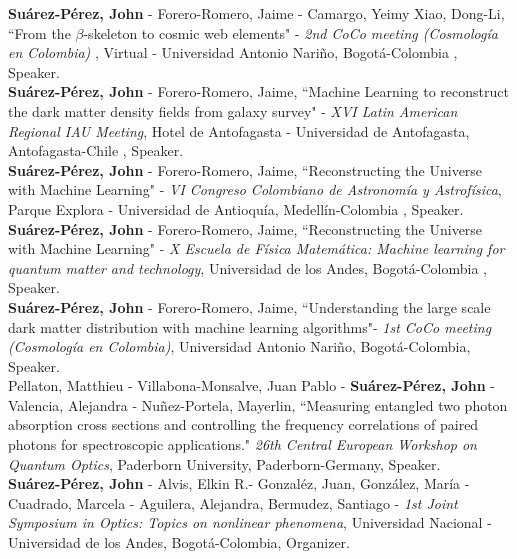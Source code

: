 \documentclass[10pt, a4paper]{article}
\newcommand{\years}[1]{\marginnote{\scriptsize #1}}
\begin{document}
\years{2020}\textbf{Suárez-Pérez, John} - Forero-Romero, Jaime - Camargo, Yeimy  Xiao, Dong-Li, “From the $\beta$-skeleton to cosmic web elements" - \emph{2nd CoCo meeting (Cosmología en Colombia) }, Virtual - Universidad Antonio Nariño, Bogotá-Colombia , Speaker.\\

\years{2019}\textbf{Suárez-Pérez, John} - Forero-Romero, Jaime, “Machine Learning to reconstruct the dark matter density fields from galaxy survey" - \emph{XVI Latin American Regional IAU Meeting}, Hotel de Antofagasta - Universidad de Antofagasta, Antofagasta-Chile , Speaker.\\

\newpage
\years{2019}\textbf{Suárez-Pérez, John} - Forero-Romero, Jaime, “Reconstructing the Universe with Machine Learning" - \emph{VI Congreso Colombiano de Astronomía y Astrofísica}, Parque Explora - Universidad de Antioquía, Medellín-Colombia , Speaker.\\

\years{2019}\textbf{Suárez-Pérez, John} - Forero-Romero, Jaime, “Reconstructing the Universe with Machine Learning" - \emph{X Escuela de Física Matemática: Machine learning for quantum matter and technology}, Universidad de los Andes, Bogotá-Colombia , Speaker.\\

\years{2019}\textbf{Suárez-Pérez, John} - Forero-Romero, Jaime, “Understanding the large scale dark matter distribution with machine learning
algorithms"- \emph{1st CoCo meeting (Cosmología en Colombia)}, Universidad Antonio Nariño, Bogotá-Colombia, Speaker.\\

\years{2019}Pellaton, Matthieu - Villabona-Monsalve, Juan Pablo - \textbf{Suárez-Pérez, John} - Valencia, Alejandra - Nuñez-Portela, Mayerlin, “Measuring entangled two photon absorption cross sections and controlling the frequency correlations of paired photons for spectroscopic applications." \emph{26th Central European Workshop on Quantum Optics}, Paderborn University, Paderborn-Germany, Speaker.\\

\years{2018}\textbf{Suárez-Pérez, John} - Alvis, Elkin R.- Gonzaléz, Juan, González, María - Cuadrado, Marcela - Aguilera, Alejandra, Bermudez, Santiago - \emph{1st Joint Symposium in Optics: Topics on nonlinear phenomena}, Universidad Nacional - Universidad de los Andes, Bogotá-Colombia, Organizer.\\
\end{document}
